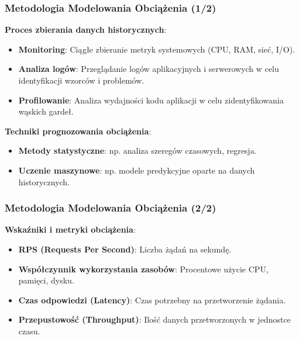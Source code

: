 \documentclass[aspectratio=169,xcolor=table]{beamer}
\begin{document}
\begin{frame}
  \frametitle{Metodologia Modelowania Obciążenia (1/2)}
  \textbf{Proces zbierania danych historycznych}:
    \begin{itemize}
        \item \textbf{Monitoring}: Ciągłe zbieranie metryk systemowych (CPU, RAM, sieć, I/O).
        \item \textbf{Analiza logów}: Przeglądanie logów aplikacyjnych i serwerowych w celu identyfikacji wzorców i problemów.
        \item \textbf{Profilowanie}: Analiza wydajności kodu aplikacji w celu zidentyfikowania wąskich gardeł.
    \end{itemize}
  \vspace{1em}
  \textbf{Techniki prognozowania obciążenia}:
    \begin{itemize}
        \item \textbf{Metody statystyczne}: np. analiza szeregów czasowych, regresja.
        \item \textbf{Uczenie maszynowe}: np. modele predykcyjne oparte na danych historycznych.
    \end{itemize}
\end{frame}

\begin{frame}
  \frametitle{Metodologia Modelowania Obciążenia (2/2)}
  \textbf{Wskaźniki i metryki obciążenia}:
    \begin{itemize}
        \item \textbf{RPS (Requests Per Second)}: Liczba żądań na sekundę.
        \item \textbf{Współczynnik wykorzystania zasobów}: Procentowe użycie CPU, pamięci, dysku.
        \item \textbf{Czas odpowiedzi (Latency)}: Czas potrzebny na przetworzenie żądania.
        \item \textbf{Przepustowość (Throughput)}: Ilość danych przetworzonych w jednostce czasu.
    \end{itemize}
\end{frame}
\end{document}
